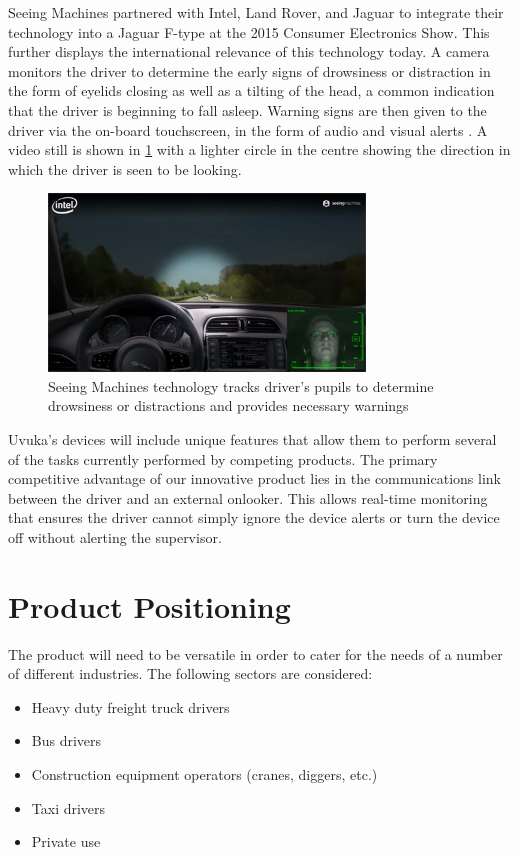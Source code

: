 Seeing Machines partnered with Intel, Land Rover, and Jaguar to integrate their technology into a Jaguar F-type at the 2015 Consumer Electronics Show. This further displays the international relevance of this technology today. A camera monitors the driver to determine the early signs of drowsiness or distraction in the form of eyelids closing as well as a tilting of the head, a common indication that the driver is beginning to fall asleep. Warning signs are then given to the driver via the on-board touchscreen, in the form of audio and visual alerts \cite{sm_similarities}. A video still is shown in \cref{fig:sm_video} with a lighter circle in the centre showing the direction in which the driver is seen to be looking.
\begin{figure}[H]
\centering
\includegraphics[width=0.75\textwidth]{images/seeingmachines.png}
\vskip10pt
\caption[Toyota driver alertness system]{Seeing Machines technology tracks driver's pupils to determine drowsiness or distractions and provides necessary warnings \cite{sm_similarities}}
\label{fig:sm_video}
\end{figure}
Uvuka's devices will include unique features that allow them to perform several of the tasks currently performed by competing products. The primary competitive advantage of our innovative product lies in the communications link between the driver and an external onlooker. This allows real-time monitoring that ensures the driver cannot simply ignore the device alerts or turn the device off without alerting the supervisor. 

\section{Product Positioning}
The product will need to be versatile in order to cater for the needs of a number of different industries. The following sectors are considered:
\begin{itemize}
\item Heavy duty freight truck drivers
\item Bus drivers
\item Construction equipment operators (cranes, diggers, etc.)
\item Taxi drivers
\item Private use
\end{itemize}

